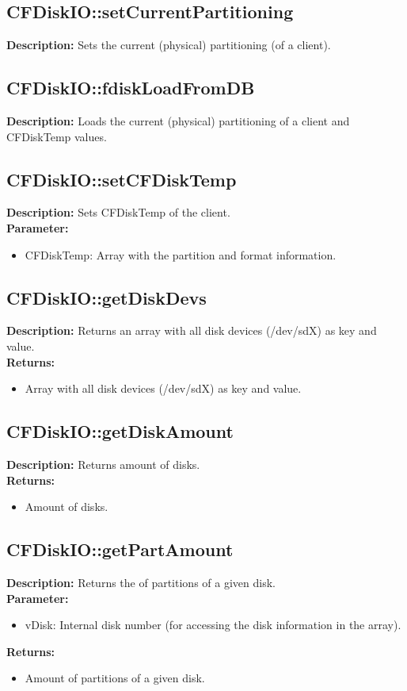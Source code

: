 \subsection{CFDiskIO::setCurrentPartitioning}
\textbf{Description:} Sets the current (physical) partitioning (of a client).\\

\subsection{CFDiskIO::fdiskLoadFromDB}
\textbf{Description:} Loads the current (physical) partitioning of a client and CFDiskTemp values.\\

\subsection{CFDiskIO::setCFDiskTemp}
\textbf{Description:} Sets CFDiskTemp of the client.\\
\textbf{Parameter:}
\begin{itemize}
\item CFDiskTemp: Array with the partition and format information.
\end{itemize}

\subsection{CFDiskIO::getDiskDevs}
\textbf{Description:} Returns an array with all disk devices (/dev/sdX) as key and value.\\
\textbf{Returns:}
\begin{itemize}
\item Array with all disk devices (/dev/sdX) as key and value.
\end{itemize}

\subsection{CFDiskIO::getDiskAmount}
\textbf{Description:} Returns amount of disks.\\
\textbf{Returns:}
\begin{itemize}
\item Amount of disks.
\end{itemize}

\subsection{CFDiskIO::getPartAmount}
\textbf{Description:} Returns the of partitions of a given disk.\\
\textbf{Parameter:}
\begin{itemize}
\item vDisk: Internal disk number (for accessing the disk information in the array).
\end{itemize}
\textbf{Returns:}
\begin{itemize}
\item Amount of partitions of a given disk.
\end{itemize}

